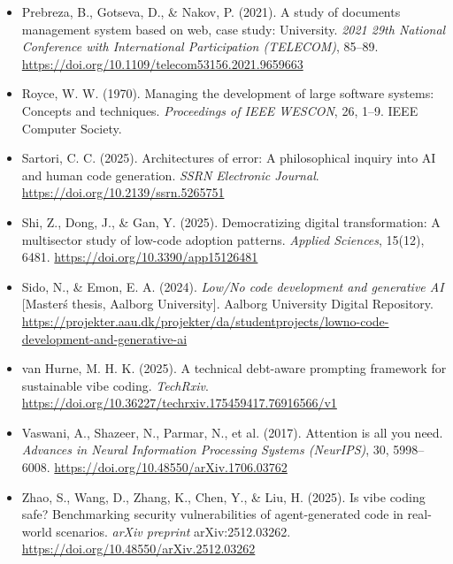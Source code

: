\begin{itemize}[leftmargin=1.5em, label={}, itemsep=0.22ex, parsep=0pt]
    \item Prebreza, B., Gotseva, D., \& Nakov, P. (2021). A study of documents management system based on web, case study: University. \textit{2021 29th National Conference with International Participation (TELECOM)}, 85--89. \url{https://doi.org/10.1109/telecom53156.2021.9659663}
    \item Royce, W. W. (1970). Managing the development of large software systems: Concepts and techniques. \textit{Proceedings of IEEE WESCON}, 26, 1--9. IEEE Computer Society.
    \item Sartori, C. C. (2025). Architectures of error: A philosophical inquiry into AI and human code generation. \textit{SSRN Electronic Journal}. \url{https://doi.org/10.2139/ssrn.5265751}
    \item Shi, Z., Dong, J., \& Gan, Y. (2025). Democratizing digital transformation: A multisector study of low-code adoption patterns. \textit{Applied Sciences}, 15(12), 6481. \url{https://doi.org/10.3390/app15126481}
    \item Sido, N., \& Emon, E. A. (2024). \textit{Low/No code development and generative AI} [Master\'s thesis, Aalborg University]. Aalborg University Digital Repository. \url{https://projekter.aau.dk/projekter/da/studentprojects/lowno-code-development-and-generative-ai}
    \item van Hurne, M. H. K. (2025). A technical debt-aware prompting framework for sustainable vibe coding. \textit{TechRxiv}. \url{https://doi.org/10.36227/techrxiv.175459417.76916566/v1}
    \item Vaswani, A., Shazeer, N., Parmar, N., et al. (2017). Attention is all you need. \textit{Advances in Neural Information Processing Systems (NeurIPS)}, 30, 5998--6008. \url{https://doi.org/10.48550/arXiv.1706.03762}
    \item Zhao, S., Wang, D., Zhang, K., Chen, Y., \& Liu, H. (2025). Is vibe coding safe? Benchmarking security vulnerabilities of agent-generated code in real-world scenarios. \textit{arXiv preprint} arXiv:2512.03262. \url{https://doi.org/10.48550/arXiv.2512.03262}
\end{itemize}
